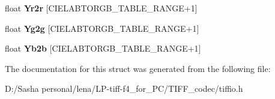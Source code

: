 \begin{DoxyCompactItemize}
\item 
\hypertarget{struct_t_i_f_f_c_i_e_lab_to_r_g_b_a8a60eae1fc00821b9c0d72cb868eb4f1}{}float {\bfseries Yr2r} \mbox{[}C\+I\+E\+L\+A\+B\+T\+O\+R\+G\+B\+\_\+\+T\+A\+B\+L\+E\+\_\+\+R\+A\+N\+G\+E+1\mbox{]}\label{struct_t_i_f_f_c_i_e_lab_to_r_g_b_a8a60eae1fc00821b9c0d72cb868eb4f1}

\item 
\hypertarget{struct_t_i_f_f_c_i_e_lab_to_r_g_b_a019b418a957b701812447754f2e75879}{}float {\bfseries Yg2g} \mbox{[}C\+I\+E\+L\+A\+B\+T\+O\+R\+G\+B\+\_\+\+T\+A\+B\+L\+E\+\_\+\+R\+A\+N\+G\+E+1\mbox{]}\label{struct_t_i_f_f_c_i_e_lab_to_r_g_b_a019b418a957b701812447754f2e75879}

\item 
\hypertarget{struct_t_i_f_f_c_i_e_lab_to_r_g_b_af15b08484a37401b247c066692ef2dec}{}float {\bfseries Yb2b} \mbox{[}C\+I\+E\+L\+A\+B\+T\+O\+R\+G\+B\+\_\+\+T\+A\+B\+L\+E\+\_\+\+R\+A\+N\+G\+E+1\mbox{]}\label{struct_t_i_f_f_c_i_e_lab_to_r_g_b_af15b08484a37401b247c066692ef2dec}

\end{DoxyCompactItemize}


The documentation for this struct was generated from the following file\+:\begin{DoxyCompactItemize}
\item 
D\+:/\+Sasha personal/lena/\+L\+P-\/tiff-\/f4\+\_\+for\+\_\+\+P\+C/\+T\+I\+F\+F\+\_\+codec/tiffio.\+h\end{DoxyCompactItemize}
